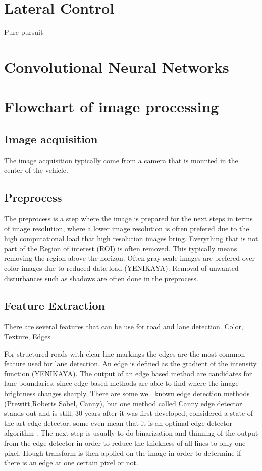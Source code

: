 \section{Lateral Control}
Pure pursuit
\section{Convolutional Neural Networks}


\section{Flowchart of image processing}
\subsection{Image acquisition}
The image acquisition typically come from a camera that is mounted in the center of the vehicle. 
\subsection{Preprocess}
The preprocess is a step where the image is prepared for the next steps in terms of image resolution, where a lower image resolution is often prefered due to the high computational load that high resolution images bring. Everything that is not part of the Region of interest (ROI) is often removed. This typically means removing the region above the horizon. Often gray-scale images are prefered over color images due to reduced data load (YENIKAYA). Removal of unwanted disturbances such as shadows are often done in the preprocess. 
\subsection{Feature Extraction}
There are several features that can be use for road and lane detection. Color, Texture, Edges

For structured roads with clear line markings the edges are the most common feature used for lane detection. An edge is defined as the gradient of the intensity function (YENIKAYA). The output of an edge based method are candidates for lane boundaries, since edge based methods are able to find where the image brightness changes sharply. There are some well known edge detection methods (Prewitt,Roberts Sobel, Canny), but one method called Canny edge detector stands out and is still, 30 years after it was first developed, considered a state-of-the-art edge detector, some even mean that it is an optimal edge detector algorithm \cite{bhadauria2013comparison}. The next step is usually to do binarization and thinning of the output from the edge detector in order to reduce the thickness of all lines to only one pixel. Hough transform is then applied on the image in order to determine if there is an edge at one certain pixel or not. 

